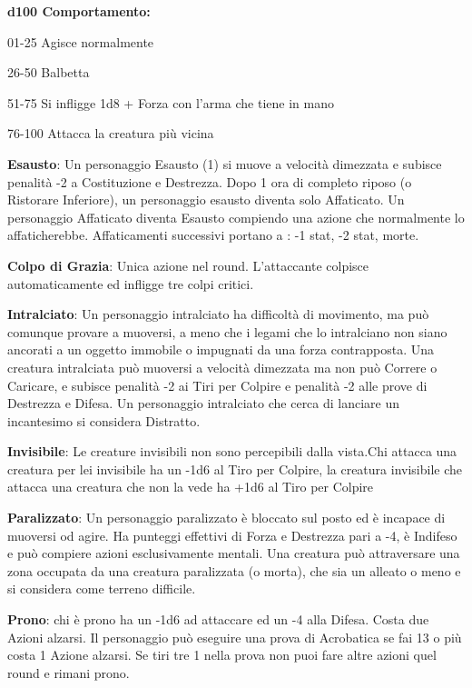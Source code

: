 \documentclass[a4paper,12 pt,openany]{book}
\begin{document}
\begin{textblock*}{19 cm}
\begin{multicols}{2}
\textbf{d100 Comportamento:}

01-25 Agisce normalmente

26-50 Balbetta

51-75 Si infligge 1d8 + Forza con l'arma che tiene in mano

76-100 Attacca la creatura più vicina

\textbf{Esausto}: Un personaggio Esausto (1) si muove a velocità dimezzata e subisce penalità -2 a Costituzione e Destrezza. Dopo 1 ora di completo riposo (o Ristorare Inferiore), un personaggio esausto diventa solo Affaticato. Un personaggio Affaticato diventa Esausto compiendo una azione che normalmente lo affaticherebbe.
Affaticamenti successivi portano a : -1 stat, -2 stat, morte.

\textbf{Colpo di Grazia}: Unica azione nel round. L'attaccante colpisce automaticamente ed infligge tre colpi critici.

\textbf{Intralciato}: Un personaggio intralciato ha difficoltà di movimento, ma può comunque provare a muoversi, a meno che i legami che lo intralciano non siano ancorati a un oggetto immobile o impugnati da una forza contrapposta.
Una creatura intralciata può muoversi a velocità dimezzata ma non può Correre o Caricare, e subisce penalità -2 ai Tiri per Colpire e penalità -2 alle prove di Destrezza e Difesa.
Un personaggio intralciato che cerca di lanciare un incantesimo si considera Distratto.

\textbf{Invisibile}: Le creature invisibili non sono percepibili dalla vista.Chi attacca una creatura per lei invisibile ha un -1d6 al Tiro per Colpire, la creatura invisibile che attacca una creatura che non la vede ha +1d6 al Tiro per Colpire

\textbf{Paralizzato}: Un personaggio paralizzato è bloccato sul posto ed è incapace di muoversi od agire. Ha punteggi effettivi di Forza e Destrezza pari a -4, è Indifeso e può compiere azioni esclusivamente mentali.
Una creatura può attraversare una zona occupata da una creatura paralizzata (o morta), che sia un alleato o meno e si considera come terreno difficile.

\textbf{Prono}: chi è prono ha un -1d6 ad attaccare ed un -4 alla Difesa. Costa due Azioni alzarsi. Il personaggio può eseguire una prova di Acrobatica se fai 13 o più costa 1 Azione alzarsi. Se tiri tre 1 nella prova non puoi fare altre azioni quel round e rimani prono.



\end{multicols}
\end{textblock*}
\end{document}
